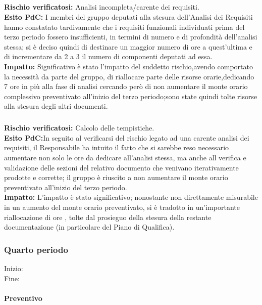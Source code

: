 \subparagraph{}
\textbf{Rischio verificatosi:} Analisi incompleta/carente dei requisiti.\\
\textbf{Esito PdC:} I membri del gruppo deputati alla stesura dell'Analisi dei Requisiti hanno constatato tardivamente
che i requisiti funzionali individuati prima del terzo periodo fossero insufficienti, in termini di numero e di 
profondità dell'analisi stessa; si è deciso quindi di destinare un maggior numero di ore a quest'ultima e di incrementare da
 2 a 3 il numero di componenti deputati ad essa. \\
\textbf{Impatto:} Significativo è stato l'impatto del suddetto rischio,avendo comportato la necessità
da parte del gruppo, di riallocare parte delle risorse orarie,dedicando 7 ore in più alla fase di analisi
cercando però di non aumentare il monte orario complessivo preventivato all'inizio del terzo periodo;sono state
quindi tolte risorse alla stesura degli altri documenti.\\

\subparagraph{}
\textbf{Rischio verificatosi:} Calcolo delle tempistiche.\\
\textbf{Esito PdC:}In seguito al verificarsi del rischio legato ad una carente analisi dei requisiti, il Responsabile ha 
intuito il fatto che si sarebbe reso necessario aumentare non solo le ore da dedicare all'analisi stessa, ma anche all verifica e 
validazione delle sezioni del relativo documento che venivano iterativamente prodotte e corrette; il gruppo è riuscito  a non aumentare
il monte orario preventivato all'inizio del terzo periodo.\\
\textbf{Impatto:} L'impatto è stato significativo; nonostante non direttamente misurabile in un aumento del monte orario preventivato,
si è tradotto in un'importante riallocazione di ore , tolte dal prosieguo della stesura della restante documentazione (in particolare del Piano
di Qualifica).\\

\subsubsection{Quarto periodo} 
Inizio: \\
Fine: 
\paragraph{Preventivo}

